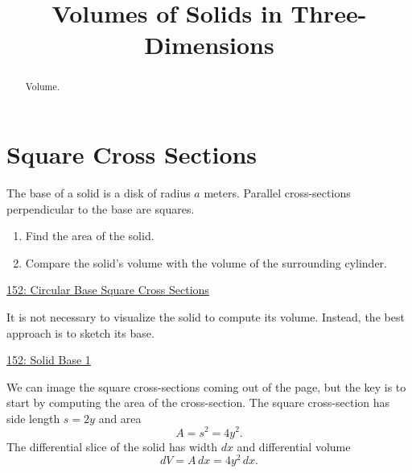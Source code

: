 \documentclass{ximera}
\title{Volumes of Solids in Three-Dimensions}
\begin{document}
\begin{abstract}
Volume.
\end{abstract}
\maketitle

\section{Square Cross Sections}

\begin{question} \label{QPkdf9fM}
The base of a solid is a disk of radius $a$ meters. Parallel cross-sections perpendicular to the base are squares. 

\begin{enumerate}
\item Find the area of the solid.
\item Compare the solid's volume with the volume of the surrounding cylinder.
\end{enumerate}

\begin{onlineOnly}
    \begin{center}
\end{center}
\end{onlineOnly}

\href{https://www.desmos.com/3d/q5jo9tip5q}{152: Circular Base Square Cross Sections}



\begin{explanation}

\item It is not necessary to visualize the solid to compute its volume. Instead, the best approach is to sketch its base.

\begin{onlineOnly}
    \begin{center}
\end{center}
\end{onlineOnly}

\href{ https://www.desmos.com/calculator/mnjevsoffp}{152: Solid Base 1}

We can image the square cross-sections coming out of the page, but the key is to start by computing the area of the cross-section. The square cross-section has side length $s=2y$ and area
\[ 
 A = s^2 = 4y^2 .
\]
The differential slice of the solid has width $dx$ and differential volume
\[
    dV = A \, dx = 4y^2 \, dx .
\]


\end{explanation}
\end{question}
\end{document}
